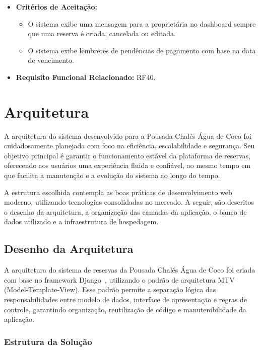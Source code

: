 \documentclass[
	12pt,				%
	openany,			%
	oneside,			%
	a4paper,			%
	english,			%
	french,				%
	spanish,			%
	brazil				%
	]{abntex2}
\begin{document}
\begin{enumerate}[label=\textbf{\arabic*.}]
\begin{itemize}
		\item \textbf{Critérios de Aceitação:}
		\begin{itemize}
			\item O sistema exibe uma mensagem para a proprietária no dashboard sempre que uma reserva é criada, cancelada ou editada.
			\item O sistema exibe lembretes de pendências de pagamento com base na data de vencimento.
		\end{itemize}
		\item \textbf{Requisito Funcional Relacionado:} RF40.
	\end{itemize} 
\end{enumerate}
\section{Arquitetura}
A arquitetura do sistema desenvolvido para a Pousada Chalés Água de Coco foi cuidadosamente planejada com foco na eficiência, escalabilidade e segurança. Seu objetivo principal é garantir o funcionamento estável da plataforma de reservas, oferecendo aos usuários uma experiência fluida e confiável, ao mesmo tempo em que facilita a manutenção e a evolução do sistema ao longo do tempo.

A estrutura escolhida contempla as boas práticas de desenvolvimento web moderno, utilizando tecnologias consolidadas no mercado. A seguir, são descritos o desenho da arquitetura, a organização das camadas da aplicação, o banco de dados utilizado e a infraestrutura de hospedagem.
\subsection{Desenho da Arquitetura}
A arquitetura do sistema de reservas da Pousada Chalés Água de Coco foi criada com base no framework Django~\cite{django}, utilizando o padrão de arquitetura MTV (Model-Template-View). Esse padrão permite a separação lógica das responsabilidades entre modelo de dados, interface de apresentação e regras de controle, garantindo organização, reutilização de código e manutenibilidade da aplicação.

\subsubsection{Estrutura da Solução}
\end{document}
